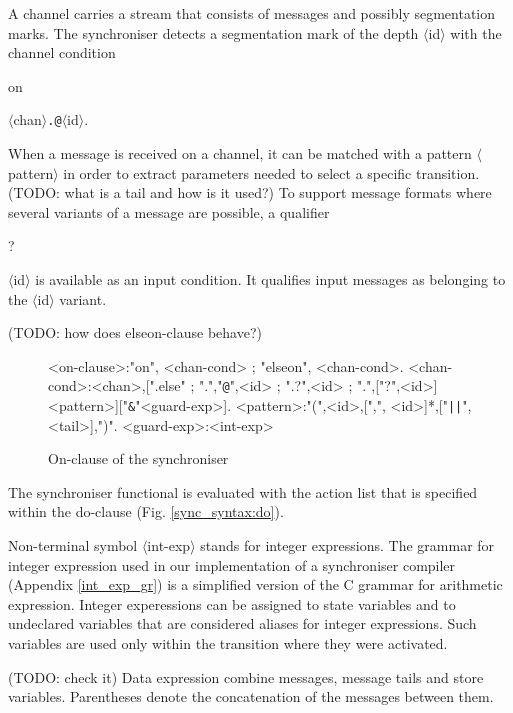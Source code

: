 A channel carries a stream that consists of messages and possibly segmentation marks. The synchroniser detects a segmentation mark of the depth $\langle$id$\rangle$ with the channel condition \begin{bf}on\end{bf} $\langle$chan$\rangle${\tt .@}$\langle$id$\rangle$. 

When a message is received on a channel, it can be matched with a pattern $\langle$pattern$\rangle$ in order to extract parameters needed to select a specific transition. (TODO: what is a tail and how is it used?) To support message formats where several variants of a message are possible, a qualifier \begin{bf}?\end{bf}$\langle$id$\rangle$ is available as an input condition. It qualifies input messages as belonging to the $\langle$id$\rangle$ variant.

(TODO: how does elseon-clause behave?)

\begin{figure}[h!]
\small
\begin{grammar}
<on-clause>:"on", <chan-cond> ; "elseon", <chan-cond>.
<chan-cond>:<chan>,[".else" ; ".","{\tt @}",<id> ; ".?",<id> ; ".",["?",<id>]<pattern>]["{\tt \&}"<guard-exp>].
<pattern>:"(",<id>,[",", <id>]*,["{\tt ||}",<tail>],")".
<guard-exp>:<int-exp>
\end{grammar}
\caption{On-clause of the synchroniser}
\label{sync_syntax:on}
\end{figure}

The synchroniser functional is evaluated with the action list that is specified within the do-clause (Fig. \ref{sync_syntax:do}).

Non-terminal symbol $\langle$int-exp$\rangle$ stands for integer expressions. The grammar for integer expression used in our implementation of a synchroniser compiler (Appendix \ref{int_exp_gr}) is a simplified version of the C grammar for arithmetic expression. Integer experessions can be assigned to state variables and to undeclared variables that are considered aliases for integer expressions. Such variables are used only within the transition where they were activated.

(TODO: check it) Data expression combine messages, message tails and store variables. Parentheses denote the concatenation of the messages between them.


